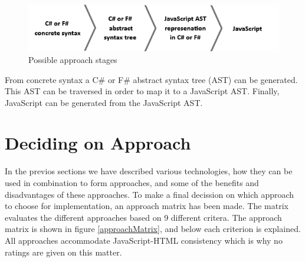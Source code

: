		\begin{figure}[H]
			\begin{center}
				\centerline{\includegraphics[width=14cm]{resources/images/stages.png}}
			\end{center}
			\caption{Possible approach stages}
			\label{stages}
		\end{figure}

	 From concrete syntax a C\# or F\# abstract syntax tree (AST) can be generated. This AST can be traversed in order to map it to a JavaScript AST. Finally, JavaScript can be generated from the JavaScript AST.



\section{Deciding on Approach} %
\label{sec:deciding_on_approach}
	In the previos sections we have described various technologies, how they can be used in combination to form approaches, and some of the benefits and disadvantages of these approaches. To make a final decission on which approach to choose for implementation, an approach matrix has been made. The matrix evaluates the different approaches based on 9 different critera. The approach matrix is shown in figure \ref{approachMatrix}, and below each criterion is explained. All approaches accommodate JavaScript-HTML consistency which is why no ratings are given on this matter.

